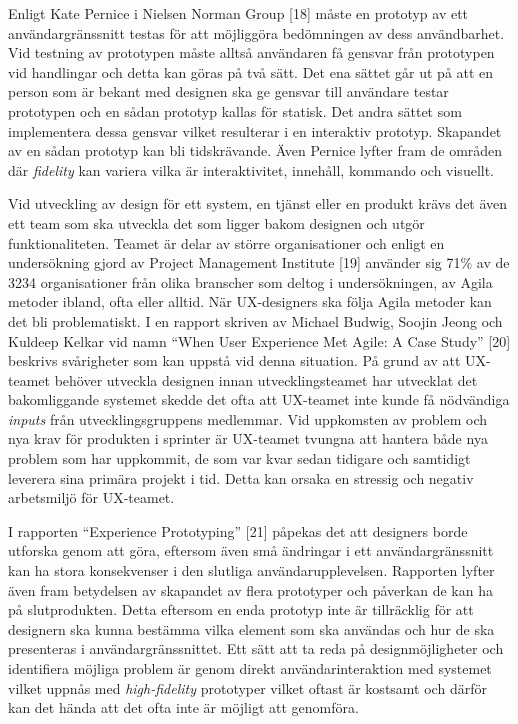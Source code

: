 \documentclass[12pt]{kththesis}
\begin{document}
Enligt Kate Pernice i Nielsen Norman Group [18] måste en prototyp av ett användargränssnitt testas för att möjliggöra bedömningen av dess användbarhet. Vid testning av prototypen måste alltså användaren få gensvar från prototypen vid handlingar och detta kan göras på två sätt. Det ena sättet går ut på att en person som är bekant med designen ska ge gensvar till användare testar prototypen och en sådan prototyp kallas för statisk. Det andra sättet som implementera dessa gensvar vilket resulterar i en interaktiv prototyp. Skapandet av en sådan prototyp kan bli tidskrävande. Även Pernice lyfter fram de områden där \textit{fidelity} kan variera vilka är interaktivitet, innehåll, kommando och visuellt. 

Vid utveckling av design för ett system, en tjänst eller en produkt krävs det även ett team som ska utveckla det som ligger bakom designen och utgör funktionaliteten. Teamet är delar av större organisationer och enligt en undersökning gjord av Project Management Institute [19] använder sig 71\% av de 3234 organisationer från olika branscher som deltog i undersökningen, av Agila metoder ibland, ofta eller alltid. När UX-designers ska följa Agila metoder kan det bli problematiskt. I en rapport skriven av Michael Budwig, Soojin Jeong och Kuldeep Kelkar vid namn “When User Experience Met Agile: A Case Study” [20] beskrivs svårigheter som kan uppstå vid denna situation. På grund av att UX-teamet behöver utveckla designen innan utvecklingsteamet har utvecklat det bakomliggande systemet skedde det ofta att UX-teamet inte kunde få nödvändiga \textit{inputs} från utvecklingsgruppens medlemmar. Vid uppkomsten av problem och nya krav för produkten i sprinter är UX-teamet tvungna att hantera både nya problem som har uppkommit, de som var kvar sedan tidigare och samtidigt leverera sina primära projekt i tid. Detta kan orsaka en stressig och negativ arbetsmiljö för UX-teamet. 

I rapporten “Experience Prototyping” [21] påpekas det att designers borde utforska genom att göra, eftersom även små ändringar i ett användargränssnitt kan ha stora konsekvenser i den slutliga användarupplevelsen. Rapporten lyfter även fram betydelsen av skapandet av flera prototyper och påverkan de kan ha på slutprodukten. Detta eftersom en enda prototyp inte är tillräcklig för att designern ska kunna bestämma vilka element som ska användas och hur de ska presenteras i användargränssnittet. Ett sätt att ta reda på designmöjligheter och identifiera möjliga problem är genom direkt användarinteraktion med systemet vilket uppnås med \textit{high-fidelity} prototyper vilket oftast är kostsamt och därför kan det hända att det ofta inte är möjligt att genomföra.
\end{document}
